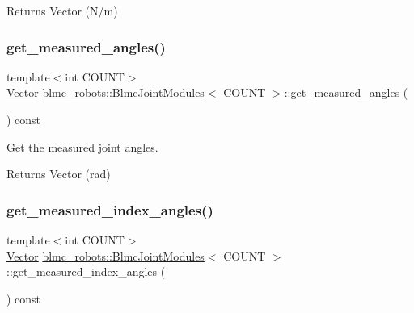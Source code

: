 \begin{DoxyReturn}{Returns}
Vector (N/m) 
\end{DoxyReturn}
\mbox{\label{classblmc__robots_1_1BlmcJointModules_abe68677ccf4bdbea975210dcd1de2fdc}} 
\subsubsection{\texorpdfstring{get\+\_\+measured\+\_\+angles()}{get\_measured\_angles()}}
{\footnotesize\ttfamily template$<$int C\+O\+U\+NT$>$ \\
\hyperlink{classblmc__robots_1_1BlmcJointModules_abaff382c6fd4b494ec0c17498d94919e}{Vector} \hyperlink{classblmc__robots_1_1BlmcJointModules}{blmc\+\_\+robots\+::\+Blmc\+Joint\+Modules}$<$ C\+O\+U\+NT $>$\+::get\+\_\+measured\+\_\+angles (\begin{DoxyParamCaption}{ }\end{DoxyParamCaption}) const\hspace{0.3cm}{\ttfamily [inline]}}



Get the measured joint angles. 

\begin{DoxyReturn}{Returns}
Vector (rad) 
\end{DoxyReturn}
\mbox{\label{classblmc__robots_1_1BlmcJointModules_afe8ecc2225292e2a4358b375465b0c93}} 
\subsubsection{\texorpdfstring{get\+\_\+measured\+\_\+index\+\_\+angles()}{get\_measured\_index\_angles()}}
{\footnotesize\ttfamily template$<$int C\+O\+U\+NT$>$ \\
\hyperlink{classblmc__robots_1_1BlmcJointModules_abaff382c6fd4b494ec0c17498d94919e}{Vector} \hyperlink{classblmc__robots_1_1BlmcJointModules}{blmc\+\_\+robots\+::\+Blmc\+Joint\+Modules}$<$ C\+O\+U\+NT $>$\+::get\+\_\+measured\+\_\+index\+\_\+angles (\begin{DoxyParamCaption}{ }\end{DoxyParamCaption}) const\hspace{0.3cm}{\ttfamily [inline]}}




